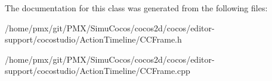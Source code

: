 The documentation for this class was generated from the following files\+:\begin{DoxyCompactItemize}
\item 
/home/pmx/git/\+P\+M\+X/\+Simu\+Cocos/cocos2d/cocos/editor-\/support/cocostudio/\+Action\+Timeline/C\+C\+Frame.\+h\item 
/home/pmx/git/\+P\+M\+X/\+Simu\+Cocos/cocos2d/cocos/editor-\/support/cocostudio/\+Action\+Timeline/C\+C\+Frame.\+cpp\end{DoxyCompactItemize}
